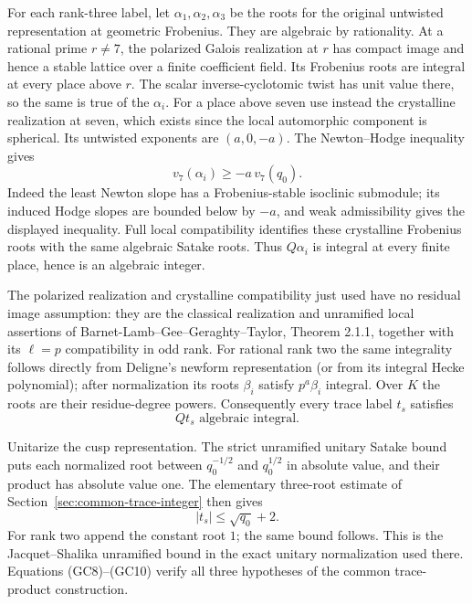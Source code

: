 For each rank-three label, let
\(\alpha_1,\alpha_2,\alpha_3\) be the
roots for the original untwisted
representation at geometric Frobenius.
They are algebraic by rationality.
At a rational prime \(r\ne7\), the
polarized Galois realization at \(r\)
has compact image and hence a stable
lattice over a finite coefficient field.
Its Frobenius roots are integral at
every place above \(r\).
The scalar inverse-cyclotomic twist
has unit value there, so the same
is true of the \(\alpha_i\).
For a place above seven use instead
the crystalline realization at seven,
which exists since the local
automorphic component is spherical.
Its untwisted exponents are
\((a,0,-a)\).
The Newton--Hodge inequality gives
\[
                       v_7(\alpha_i)\ge-a\,v_7(q_0).
\]
Indeed the least Newton slope has a
Frobenius-stable isoclinic submodule;
its induced Hodge slopes are bounded
below by \(-a\), and weak admissibility
gives the displayed inequality.
Full local compatibility identifies
these crystalline Frobenius roots
with the same algebraic Satake roots.
Thus \(Q\alpha_i\) is integral at
every finite place, hence is an
algebraic integer.

The polarized realization and
crystalline compatibility just used
have no residual image assumption:
they are the classical realization
and unramified local assertions of
Barnet-Lamb--Gee--Geraghty--Taylor,
Theorem 2.1.1, together with its
\(\ell=p\) compatibility in odd rank.
For rational rank two the same
integrality follows directly from
Deligne's newform representation
(or from its integral Hecke
polynomial); after normalization
its roots \(\beta_i\) satisfy
\(p^a\beta_i\) integral.
Over \(K\) the roots are their
residue-degree powers.
Consequently every trace label \(t_s\)
satisfies
\[
                         Qt_s\text{ algebraic integral}. \tag{GC9}
\]

Unitarize the cusp representation.
The strict unramified unitary Satake
bound puts each normalized root
between \(q_0^{-1/2}\) and \(q_0^{1/2}\)
in absolute value, and their product
has absolute value one.
The elementary three-root estimate
of Section~\ref{sec:common-trace-integer}
then gives
\[
                            |t_s|\le\sqrt{q_0}+2 .            \tag{GC10}
\]
For rank two append the constant
root \(1\); the same bound follows.
This is the Jacquet--Shalika
unramified bound in the exact
unitary normalization used there.
Equations (GC8)--(GC10) verify all
three hypotheses of the common
trace-product construction.

